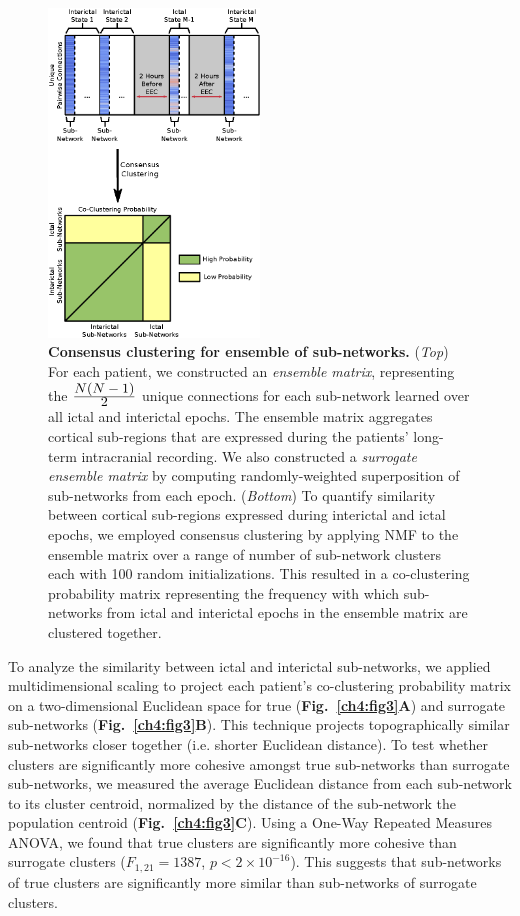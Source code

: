 \begin{figure}[H]
    \centering
    \includegraphics[width=0.5\textwidth]{panel2.eps}
    \caption[Consensus clustering of sub-network ensembles]{\textbf{Consensus clustering for ensemble of sub-networks.} (\textit{Top}) For each patient, we constructed an \textit{ensemble matrix}, representing the $\frac{\displaystyle N(N-1)}{\displaystyle 2}$ unique connections for each sub-network learned over all ictal and interictal epochs. The ensemble matrix aggregates cortical sub-regions that are expressed during the patients' long-term intracranial recording. We also constructed a \textit{surrogate ensemble matrix} by computing randomly-weighted superposition of sub-networks from each epoch. (\textit{Bottom}) To quantify similarity between cortical sub-regions expressed during interictal and ictal epochs, we employed consensus clustering by applying NMF to the ensemble matrix over a range of number of sub-network clusters each with 100 random initializations. This resulted in a co-clustering probability matrix representing the frequency with which sub-networks from ictal and interictal epochs in the ensemble matrix are clustered together. \label{ch4:fig2}}  
\end{figure}

To analyze the similarity between ictal and interictal sub-networks, we applied multidimensional scaling to project each patient's co-clustering probability matrix on a two-dimensional Euclidean space for true (\textbf{Fig.~\ref{ch4:fig3}A}) and surrogate sub-networks (\textbf{Fig.~\ref{ch4:fig3}B}). This technique projects topographically similar sub-networks closer together (i.e. shorter Euclidean distance). To test whether clusters are significantly more cohesive amongst true sub-networks than surrogate sub-networks, we measured the average Euclidean distance from each sub-network to its cluster centroid, normalized by the distance of the sub-network the population centroid (\textbf{Fig.~\ref{ch4:fig3}C}). Using a One-Way Repeated Measures ANOVA, we found that true clusters are significantly more cohesive than surrogate clusters ($F_{1,21}=1387$, $p<2\times10^{-16}$). This suggests that sub-networks of true clusters are significantly more similar than sub-networks of surrogate clusters. 

